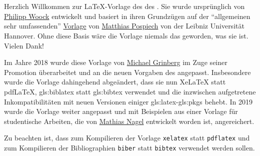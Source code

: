 \chapter*{\TransAcknowledgements}
%
%
%
\markboth{\TransAcknowledgements}{\TransAcknowledgements}
%
%
Herzlich Willkommen zur \LaTeX-Vorlage
des  %
des . %
Sie wurde ursprünglich von
\href{http://ies.anthropomatik.kit.edu/mitarbeiter.php?person=woock}{Philipp Woock}
entwickelt und basiert in ihren Grundzügen auf der \enquote{allgemeinen sehr umfassenden}
\href{http://www.matthiaspospiech.de/latex/templates/thesis/}{Vorlage} von 
\href{http://www.matthiaspospiech.de}{Matthias Pospiech} von der Leibniz Universität Hannover.
Ohne diese Basis wäre die Vorlage niemals das geworden, was sie ist. Vielen Dank!

Im Jahre 2018 wurde diese Vorlage von
\href{http://ies.anthropomatik.kit.edu/mitarbeiter.php?person=grinberg}{Michael Grinberg}
im Zuge seiner Promotion überarbeitet und an die neuen Vorgaben des  angepasst.
Insbesondere wurde die Vorlage dahingehend abgeändert, dass sie nun XeLaTeX statt pdfLaTeX, 
\gls{gls:biblatex} statt \gls{gls:bibtex} verwendet und die inzwischen aufgetretene
Inkompatibilitäten mit neuen Versionen einiger \gls{gls:latex}-\glspl{gls:pkg} behebt.
In 2019 wurde die Vorlage weiter angepasst und mit Beispielen aus einer Vorlage
für studentische Arbeiten, die von
\href{https://crypto.iti.kit.edu/index.php?id=nagel}{Mathias Nagel}
entwickelt worden ist, angereichert.

Zu beachten ist, dass zum Kompilieren der Vorlage \texttt{xelatex} statt \texttt{pdflatex}
und zum Kompilieren der Bibliographien \texttt{biber} statt \texttt{bibtex} verwendet werden sollen.